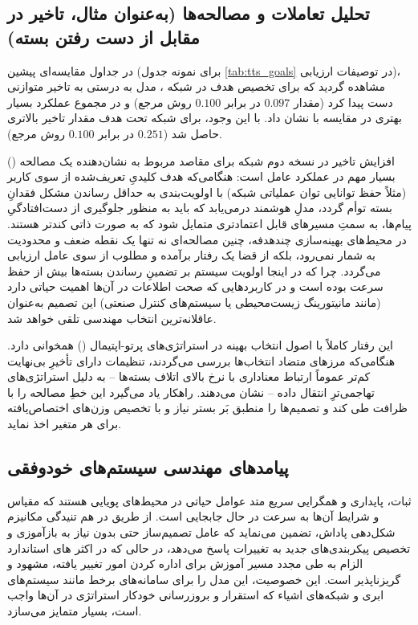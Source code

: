 \documentclass[oneside,openany,phd]{TMU-Thesis}
\begin{document}
\subsection{تحلیل تعاملات و مصالحه‌ها (به‌عنوان مثال، تاخیر در مقابل از دست رفتن بسته)}

در جداول مقایسه‌ای پیشین (برای نمونه جدول \ref{tab:tts_goals} در توصیفات ارزیابی)، مشاهده گردید که برای تخصیص هدف  در شبکه ، مدل  به درستی به تاخیر متوازنی دست پیدا کرد (مقدار $0.097$ در برابر $0.100$ روش مرجع) و در مجموع عملکرد بسیار بهتری در مقایسه با  نشان داد. با این وجود، برای شبکه  تحت هدف  مقدار تاخیر بالاتری حاصل شد ($0.251$ در برابر $0.100$ روش مرجع).

افزایش تاخیر در نسخه دوم شبکه برای مقاصد مربوط به  نشان‌دهنده یک مصالحه () بسیار مهم در عملکرد عامل است: هنگامی‌که هدف کلیدیِ تعریف‌شده از سوی کاربر (مثلاً حفظ توانایی توان عملیاتی شبکه) با اولویت‌بندی به حداقل رساندن مشکل فقدانِ بسته توأم گردد، مدلِ هوشمند درمی‌یابد که باید به منظور جلوگیری از دست‌افتادگیِ پیام‌ها، به سمتِ مسیرهای قابل اعتمادتری متمایل شود که به صورت ذاتی کندتر هستند. در محیط‌های بهینه‌سازی چندهدفه، چنین مصالحه‌ای نه تنها یک نقطه ضعف و محدودیت به شمار نمی‌رود، بلکه از قضا یک رفتار برآمده و مطلوب از سوی عامل ارزیابی می‌گردد. چرا که در اینجا اولویت سیستم بر تضمینِ رساندن بسته‌ها بیش از حفظ سرعت بوده است و در کاربردهایی که صحت اطلاعات در آن‌ها اهمیت حیاتی دارد (مانند مانیتورینگ زیست‌محیطی یا سیستم‌های کنترل صنعتی) این تصمیم به‌عنوان عاقلانه‌ترین انتخاب مهندسی تلقی خواهد شد.

این رفتار کاملاً با اصول انتخاب بهینه در استراتژی‌های پرتو-اپتیمال () همخوانی دارد. هنگامی‌که مرزهای متضاد انتخاب‌ها بررسی می‌گردند، تنظیمات دارای تأخیرِ بی‌نهایت کم‌تر عموماً ارتباط معناداری با نرخ بالای اتلاف بسته‌ها – به دلیل استراتژی‌های تهاجمی‌ترِ انتقال داده – نشان می‌دهند. راهکار  یاد می‌گیرد این خطِ مصالحه را با ظرافت طی کند و تصمیم‌ها را منطبق بَر بستر نیاز و با تخصیص وزن‌های اختصاص‌یافته برای هر متغیر اخذ نماید.

\subsection{پیامدهای مهندسی سیستم‌های خودوفقی}

ثبات، پایداری و همگرایی سریع متد  عوامل حیاتی در محیط‌های پویایی هستند که مقیاس و شرایط آن‌ها به سرعت در حال جابجایی است. از طریق در هم تنیدگی مکانیزم شکل‌دهی پاداش،  تضمین می‌نماید که عامل تصمیم‌ساز حتی بدون نیاز به بازآموزی و تخصیص پیکربندی‌های جدید به تغییرات پاسخ می‌دهد، در حالی که در اکثر های استاندارد الزام به طی مجدد مسیر آموزش برای اداره کردن امور تغییر یافته، مشهود و گریز‌ناپذیر است. این خصوصیت، این مدل را برای سامانه‌های برخط مانند سیستم‌های ابری و شبکه‌های اشیاء که استقرار و بروزرسانی خودکار استراتژی در آن‌ها واجب است، بسیار متمایز می‌سازد.
\end{document}
